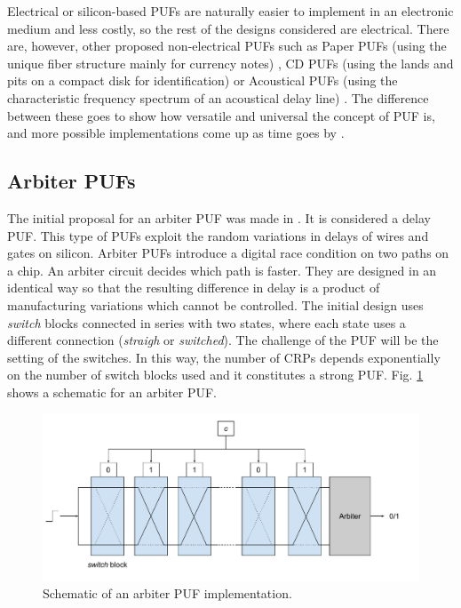 Electrical or silicon-based PUFs are naturally easier to implement in an electronic medium and less costly, so the rest of the designs considered are electrical. There are, however, other proposed non-electrical PUFs such as Paper PUFs (using the unique fiber structure mainly for currency notes) \cite{paperpuf}, CD PUFs (using the lands and pits on a compact disk for identification) \cite{Hammouri2009CDsHF} or Acoustical PUFs (using the characteristic frequency spectrum of an acoustical delay line) \cite{mastersthesis}. The difference between these goes to show how versatile and universal the concept of PUF is, and more possible implementations come up as time goes by \cite{McGrath2019}. 

\subsection{Arbiter PUFs}

The initial proposal for an arbiter PUF was made in \cite{Arbiter}. It is considered a delay PUF. This type of PUFs exploit the random variations in delays of wires and gates on silicon. Arbiter PUFs introduce a digital race condition on two paths on a chip. An arbiter circuit decides which path is faster. They are designed in an identical way so that the resulting difference in delay is a product of manufacturing variations which cannot be controlled. The initial design uses \textit{switch} blocks connected in series with two states, where each state uses a different connection (\textit{straigh} or \textit{switched}). The challenge of the PUF will be the setting of the switches. In this way, the number of CRPs depends exponentially on the number of switch blocks used and it constitutes a strong PUF. Fig. \ref{fig:arbiter} shows a schematic for an arbiter PUF. 


\begin{figure}[H]
    \centering
    \includegraphics[width=15cm]{images/Arbiter.pdf}
    \caption{Schematic of an arbiter PUF implementation.}
    \label{fig:arbiter}
\end{figure}


